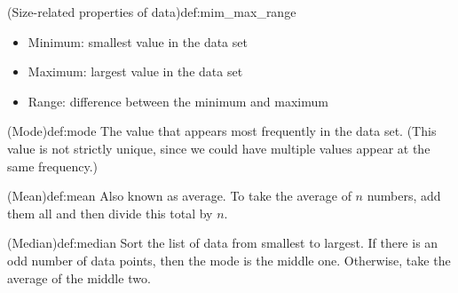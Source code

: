 \documentclass{article}
\begin{document}
\begin{definition}{(Size-related properties of data)}{def:mim_max_range}
    \begin{itemize}
        \item Minimum: smallest value in the data set
        \item Maximum: largest value in the data set
        \item Range: difference between the minimum and maximum
    \end{itemize}
\end{definition}

\begin{definition}{(Mode)}{def:mode}
    The value that appears most frequently in the data set. (This value is not strictly unique, since we could have multiple values appear at the same frequency.)
\end{definition}

\begin{definition}{(Mean)}{def:mean}
    Also known as average. To take the average of $n$ numbers, add them all and then divide this total by $n$.
\end{definition}

\begin{definition}{(Median)}{def:median}
    Sort the list of data from smallest to largest. If there is an odd number of data points, then the mode is the middle one. Otherwise, take the average of the middle two.
\end{definition}
\end{document}
